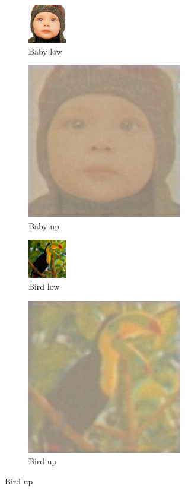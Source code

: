 \documentclass[11pt,twocolumn,twoside,paper=a4]{IEEEtran}
\begin{document}
\begin{figure}[ht] 

        \begin{subfigure}{.12\textwidth}
        \centering
        \includegraphics[scale=1]{../images/baby_low.jpg}  
        \caption{Baby low}
        \label{fig:baby_low}
        \end{subfigure} 
        
        \begin{subfigure}{.12\textwidth}
        \centering
        \includegraphics[scale=0.25]{../images/baby_up.jpg}  
        \caption{Baby up}
        \label{fig:baby_up}
        \end{subfigure}

        \begin{subfigure}{.12\textwidth}
        \centering
        \includegraphics[scale=1]{../images/bird_low.jpg}  
        \caption{Bird low}
        \label{fig:bird_low}
        \end{subfigure} 
        
        \begin{subfigure}{.12\textwidth}
        \centering
        \includegraphics[scale=0.25]{../images/bird_up.jpg}  
        \caption{Bird up}
        \label{fig:bird_up}
        \end{subfigure}


\end{figure}
\end{document}
